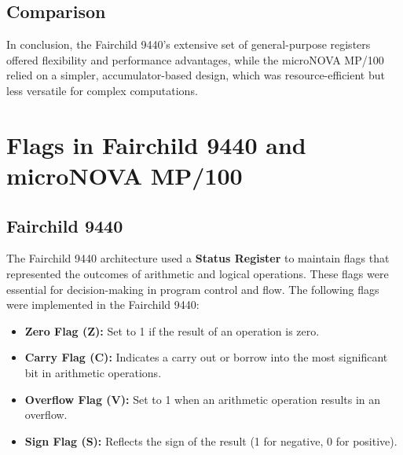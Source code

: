 \documentclass[a4paper,12pt]{article}
\begin{document}
\subsection{Comparison}

\begin{table}[H]
\centering
{}
\caption{Comparison of Fairchild 9440 and microNOVA MP/100 Registers}
\end{table}


In conclusion, the Fairchild 9440's extensive set of general-purpose registers offered flexibility and performance advantages, while the microNOVA MP/100 relied on a simpler, accumulator-based design, which was resource-efficient but less versatile for complex computations.

\section{Flags in Fairchild 9440 and microNOVA MP/100}

\subsection{Fairchild 9440}

The Fairchild 9440 architecture used a \textbf{Status Register} to maintain flags that represented the outcomes of arithmetic and logical operations. These flags were essential for decision-making in program control and flow. The following flags were implemented in the Fairchild 9440:
\begin{itemize}
    \item \textbf{Zero Flag (Z):} Set to 1 if the result of an operation is zero.
    \item \textbf{Carry Flag (C):} Indicates a carry out or borrow into the most significant bit in arithmetic operations.
    \item \textbf{Overflow Flag (V):} Set to 1 when an arithmetic operation results in an overflow.
    \item \textbf{Sign Flag (S):} Reflects the sign of the result (1 for negative, 0 for positive).
\end{itemize}
\end{document}
